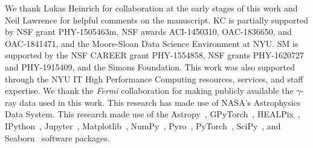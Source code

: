 \documentclass[]{article}
\begin{document}
\begin{ack}
We thank Lukas Heinrich for collaboration at the early stages of this work and Neil Lawrence for helpful comments on the manuscript. KC is partially supported by NSF grant PHY-1505463m, NSF awards ACI-1450310, OAC-1836650, and OAC-1841471, and the Moore-Sloan Data Science Environment at NYU. SM is supported by the NSF CAREER grant PHY-1554858, NSF grants PHY-1620727 and PHY-1915409, and the Simons Foundation. This work was also supported through the NYU IT High Performance Computing resources, services, and staff expertise. 
We thank the \emph{Fermi} collaboration for making publicly available the $\gamma$-ray data used in this work. This research has made use of NASA's Astrophysics Data System. This research made use of the Astropy~\cite{Robitaille:2013mpa,Price-Whelan:2018hus},
GPyTorch~\cite{gardner2018gpytorch},
HEALPix~\cite{Gorski:2004by,Zonca2019},
IPython~\cite{PER-GRA:2007},
Jupyter~\cite{Kluyver2016JupyterN},
Matplotlib~\cite{Hunter:2007},
NumPy~\cite{harris_array_2020},
Pyro~\cite{bingham2019pyro},
PyTorch~\cite{NEURIPS2019_9015},
SciPy~\cite{2020SciPy-NMeth}, and
Seaborn~\cite{michael_waskom_2017_883859}
software packages.
\end{ack}



\end{document}
